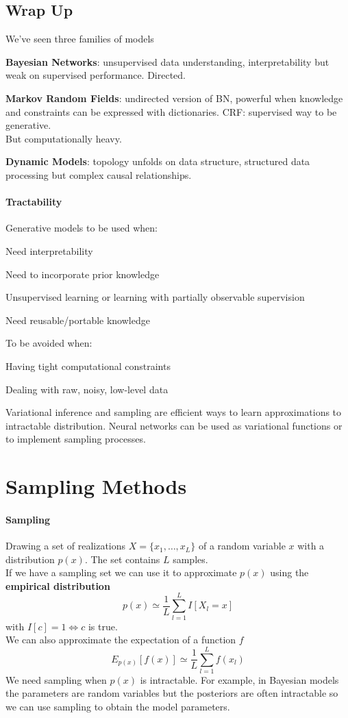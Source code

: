 \documentclass[10pt]{report}
\begin{document}
\subsection{Wrap Up}
We've seen three families of models\begin{list}{}{}
	\item \textbf{Bayesian Networks}: unsupervised data understanding, interpretability but weak on supervised performance. Directed.
	\item \textbf{Markov Random Fields}: undirected version of BN, powerful when knowledge and constraints can be expressed with dictionaries. CRF: supervised way to be generative.\\
	But computationally heavy.
	\item \textbf{Dynamic Models}: topology unfolds on data structure, structured data processing but complex causal relationships.
\end{list}
\paragraph{Tractability} Generative models to be used when:
\begin{list}{}{}
	\item Need interpretability
	\item Need to incorporate prior knowledge
	\item Unsupervised learning or learning with partially observable supervision
	\item Need reusable/portable knowledge
\end{list}
To be avoided when:
\begin{list}{}{}
	\item Having tight computational constraints
	\item Dealing with raw, noisy, low-level data
\end{list}
Variational inference and sampling are efficient ways to learn approximations to intractable distribution. Neural networks can be used as variational functions or to implement sampling processes.
\section{Sampling Methods} 
\paragraph{Sampling} Drawing a set of realizations $X = \{x_1,\ldots,x_L\}$ of a random variable $x$ with a distribution $p(x)$. The set contains $L$ samples.\\
If we have a sampling set we can use it to approximate $p(x)$ using the \textbf{empirical distribution} $$p(x)\simeq \frac{1}{L}\sum_{l=1}^L I[X_l = x]$$ with $I[c] = 1 \Leftrightarrow c$ is true.\\
We can also approximate the expectation of a function $f$ $$E_{p(x)}[f(x)]\simeq \frac{1}{L}\sum_{l=1}^L f(x_l)$$
We need sampling when $p(x)$ is intractable. For example, in Bayesian models the parameters are random variables but the posteriors are often intractable so we can use sampling to obtain the model parameters.
\end{document}
